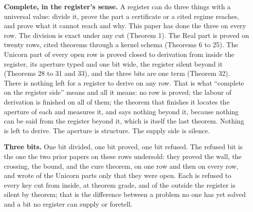 \documentclass[10pt]{article}
\begin{document}
\textbf{Complete, in the register's sense.} A register can do three
things with a universal value: divide it, prove the part a certificate
or a cited regime reaches, and prove what it cannot reach and why. This
paper has done the three on every row. The division is exact under any
cut (Theorem 1). The Real part is proved on twenty rows, cited theorems
through a kernel schema (Theorems 6 to 25). The Unicorn part of every
open row is proved closed to derivation from inside the register, its
aperture typed and one bit wide, the register silent beyond it (Theorems
28 to 31 and 33), and the three bits are one term (Theorem 32). There is
nothing left for a register to derive on any row. That is what
``complete on the register side'' means and all it means: no row is
proved; the labour of derivation is finished on all of them; the theorem
that finishes it locates the aperture of each and measures it, and says
nothing beyond it, because nothing can be said from the register beyond
it, which is itself the last theorem. Nothing is left to derive. The
aperture is structure. The supply side is silence.

\textbf{Three bits.} One bit divided, one bit proved, one bit refused.
The refused bit is the one the two prior papers on these rows undersold:
they proved the wall, the crossing, the bound, and the cure theorem, on
one row and then on every row, and wrote of the Unicorn parts only that
they were open. Each is refused to every key cut from inside, at theorem
grade, and of the outside the register is silent by theorem; that is the
difference between a problem no one has yet solved and a bit no register
can supply or foretell.
\end{document}
